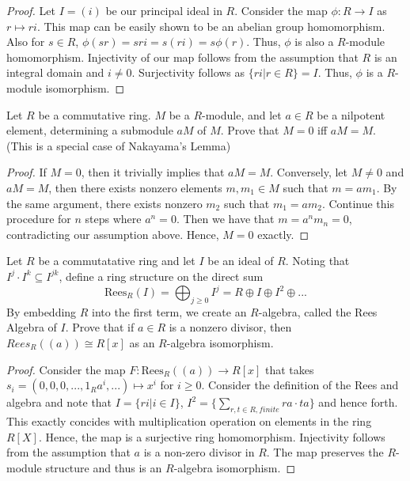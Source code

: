 \documentclass[Aluffi.tex]{subfiles}
\begin{document}
\begin{proof}
Let $I = (i)$ be our principal ideal in $R$. Consider the map $\phi: R \rightarrow I$ as $r \mapsto ri$. This map can be easily shown to be an abelian group homomorphism. Also for $s \in R$, $\phi(sr) = sri = s(ri) = s \phi(r)$. Thus, $\phi$ is also a $R$-module homomorphism. Injectivity of our map follows from the assumption that $R$ is an integral domain and $i \neq 0$. Surjectivity follows as $\{ri \vert r \in R\} = I$. Thus, $\phi$ is a $R$-module isomorphism. 
\end{proof}

\begin{problem}
Let $R$ be a commutative ring. $M$ be a $R$-module, and let $a \in R$ be a nilpotent element, determining a submodule $aM$ of $M$. Prove that $M = 0$ iff $aM = M$. (This is a special case of Nakayama's Lemma)
\end{problem}

\begin{proof}
If $M = 0$, then it trivially implies that $aM =M$. Conversely, let $M \neq 0$ and $aM = M$, then there exists  nonzero elements $m,m_1 \in M$ such that $m = am_1$. By the same argument, there exists nonzero $m_2$
such that $m_1 = am_2$. Continue this procedure for $n$ steps where $a^n = 0$. Then we have that $m = a^nm_n = 0$, contradicting our assumption above. Hence, $M = 0$ exactly.
\end{proof}

\begin{problem}
Let $R$ be a commutatative ring and let $I$ be an ideal of $R$. Noting that $I^j \cdot I^k \subseteq I^{jk}$,
define a ring structure on the direct sum 
$$\text{Rees}_R(I) = \bigoplus_{j \geq 0} I^j = R \oplus I \oplus I^2 \oplus ...$$
By embedding $R$ into the first term, we create an $R$-algebra, called the Rees Algebra of $I$. Prove that if $a \in R$ is a nonzero divisor, then $Rees_{R}((a)) \cong R[x]$ as an $R$-algebra isomorphism. 
\end{problem}

\begin{proof}
Consider the map $F: \text{Rees}_R((a)) \rightarrow R[x]$ that takes $s_i = (0,0,0,...,1_Ra^i,...) \mapsto x^i$ for $i \geq 0$.  Consider the definition of the Rees and algebra and note that 
$ I = \{ri \vert i \in I\}$, $I^2 = \{\sum_{r,t \in R,finite} ra \cdot ta \}$ and hence forth. This exactly concides with multiplication operation on elements in the ring $R[X]$. Hence, the map is a surjective ring homomorphism. Injectivity follows from the assumption that $a$ is a non-zero divisor in $R$. The map preserves the $R$-module structure and thus is an $R$-algebra isomorphism.  
\end{proof}
\end{document}
